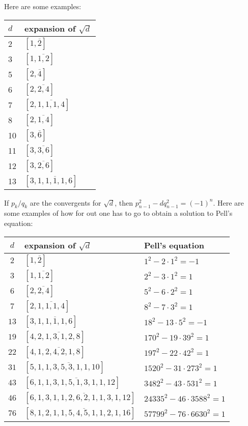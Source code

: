 Here are some examples:
\begin{center}
\begin{tabular}{l|l}
$d$ & expansion of $\sqrt d$ \\ \hline
2 & $[1,\overline 2]$ \\
3 & $[1,\overline{1,2}]$ \\
5 & $[2,\overline 4]$ \\
6 & $[2,\overline{2,4}]$ \\
7 & $[2,\overline{1,1,1,4}]$ \\
8 & $[2,\overline{1,4}]$ \\
10 & $[3,\overline 6]$ \\
11 & $[3,\overline{3,6}]$ \\
12 & $[3,\overline{2,6}]$ \\
13 & $[3,\overline{1,1,1,1,6}]$ 
\end{tabular}
\end{center}
If $p_k/q_k$ are the convergents for $\sqrt d$, then 
$p_{n-1}^2 - d q_{n-1}^2 = (-1)^n$. Here are some examples of how for out one 
has to go to obtain a solution to Pell's equation:
\begin{center}
\begin{tabular}{c|ll}
$d$ & expansion of $\sqrt d$ & Pell's equation \\ \hline 
$2$ & $[1,\overline 2]$ & $1^2 - 2\cdot 1^2 = -1$ \\
$3$ & $[1,\overline{1,2}]$ & $2^2 - 3\cdot 1^2 = 1$ \\
$6$ & $[2,\overline{2,4}]$ & $5^2 - 6\cdot 2^2 = 1$ \\
$7$ & $[2,\overline{1,1,1,4}]$ & $8^2 - 7\cdot 3^2 = 1$ \\
$13$ & $[3,\overline{1,1,1,1,6}]$ & $18^2 - 13\cdot 5^2 = -1$ \\
$19$ & $[4,\overline{2,1,3,1,2,8}]$ & $170^2 - 19\cdot 39^2 = 1$ \\
$22$ & $[4,\overline{1,2,4,2,1,8}]$ & $197^2 - 22\cdot 42^2 = 1$ \\
$31$ & $[5,\overline{1,1,3,5,3,1,1,10}]$ & $1520^2 - 31\cdot 273^2 = 1$ \\
$43$ & $[6,\overline{1,1,3,1,5,1,3,1,1,12}]$ & $3482^2 - 43\cdot 531^2 = 1$ \\
$46$ & $[6,\overline{1,3,1,1,2,6,2,1,1,3,1,12}]$ & $24335^2 - 46\cdot 3588^2 = 1$ \\
$76$ & $[8,\overline{1,2,1,1,5,4,5,1,1,2,1,16}]$ & $57799^2 - 76\cdot 6630^2 = 1$
\end{tabular}
\end{center}
